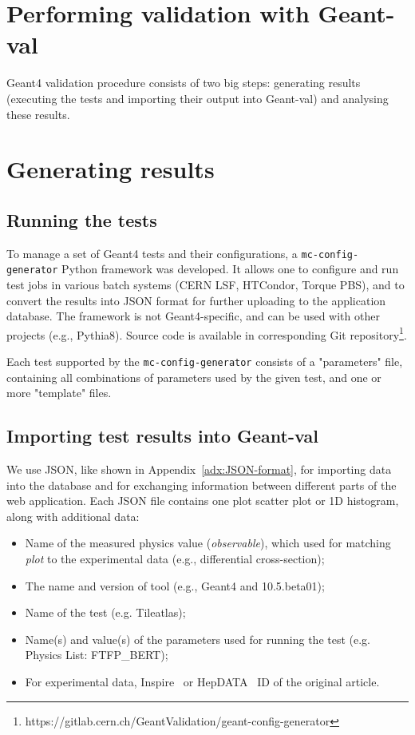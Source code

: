 \section{Performing validation with Geant-val}
\label{sec-workflow}

Geant4 validation procedure consists of two big steps: generating results (executing the tests and importing their output into Geant-val) and analysing these results.


\section{Generating results}

\subsection{Running the tests}

To manage a set of Geant4 tests and their configurations, a {\tt mc-config-generator} Python framework was developed. It allows one to configure and run test jobs in various batch systems (CERN LSF, HTCondor, Torque PBS), and to convert the results into  JSON format for further uploading to the application database. The framework is not Geant4-specific, and can be used with other projects (e.g., Pythia8). Source code is available in corresponding Git repository\footnote{https://gitlab.cern.ch/GeantValidation/geant-config-generator}.

Each test supported by the {\tt mc-config-generator} consists of a "parameters" file, containing all combinations of parameters used by the given test, and one or more "template" files.

\subsection{Importing test results into Geant-val}

We use JSON, like shown in Appendix~\ref{adx:JSON-format}, for importing data into the database and for exchanging information between different parts of the web application. Each JSON file contains one plot scatter plot or 1D histogram, along with additional data:

\begin{itemize}
    \item Name of the measured physics value (\textit{observable}), which used for matching \textit{plot} to the experimental data (e.g., differential cross-section);
    \item The name and version of tool (e.g., Geant4 and 10.5.beta01);
    \item Name of the test (e.g. Tileatlas);
    \item Name(s) and value(s) of the parameters used for running the test (e.g. Physics List: FTFP\_BERT);
    \item For experimental data, Inspire~\cite{inspire} or HepDATA~\cite{hepdata} ID of the original article.
\end{itemize}

